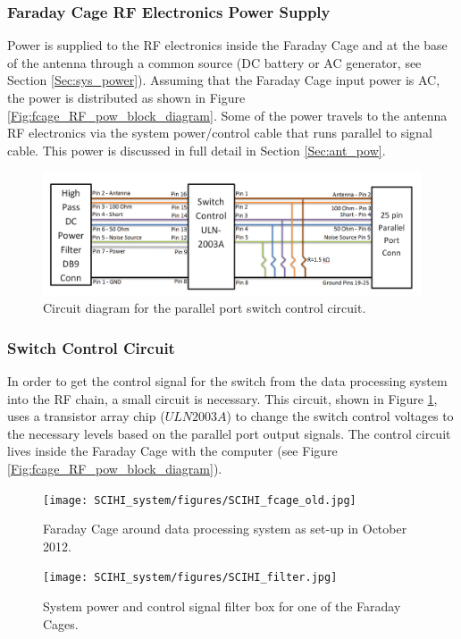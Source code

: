 \subsubsection{Faraday Cage RF Electronics Power Supply}

Power is supplied to the RF electronics inside the Faraday Cage and at the base of the antenna through a common source (DC battery or AC generator, see Section \ref{Sec:sys_power}). Assuming that the Faraday Cage input power is AC, the power is distributed as shown in Figure \ref{Fig:fcage_RF_pow_block_diagram}. Some of the power travels to the antenna RF electronics via the system power/control cable that runs parallel to signal cable. This power is discussed in full detail in Section \ref{Sec:ant_pow}. 

\begin{figure}[htb]
\begin{center}
\includegraphics[width=0.9\linewidth]{SCIHI_system/figures/fcage_pp_con_circuit_diagram.png}
\caption{Circuit diagram for the parallel port switch control circuit.}
\label{Fig:fcage_ppcon_block_diagram}
\end{center}
\end{figure}

\subsubsection{Switch Control Circuit}

In order to get the control signal for the switch from the data processing system into the RF chain, a small circuit is necessary. This circuit, shown in Figure \ref{Fig:fcage_ppcon_block_diagram}, uses a transistor array chip ($ULN2003A$) to change the switch control voltages to the necessary levels based on the parallel port output signals. The control circuit lives inside the Faraday Cage with the computer (see Figure \ref{Fig:fcage_RF_pow_block_diagram}). 

\begin{figure}[htb]
\centering
\begin{minipage}[b]{0.37\textwidth}
\centering
\texttt{[image: SCIHI\_system/figures/SCIHI\_fcage\_old.jpg]}
\caption{Faraday Cage around data processing system as set-up in October 2012.}
\label{Fig:fcage_old}
\end{minipage}%
\begin{minipage}[b]{0.02\textwidth}
\hspace{1cm}
\end{minipage}%
\begin{minipage}[b]{0.61\textwidth}
\centering
\texttt{[image: SCIHI\_system/figures/SCIHI\_filter.jpg]}
\caption{System power and control signal filter box for one of the Faraday Cages.}
\label{Fig:fcage_filter}
\end{minipage}
\end{figure}

